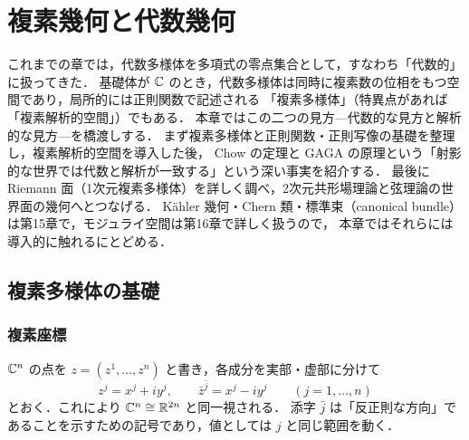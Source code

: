 \chapter{複素幾何と代数幾何}
\label{ch:ch13}

\begin{chapterlead}
これまでの章では，代数多様体を多項式の零点集合として，すなわち「代数的」に扱ってきた．
基礎体が $\mathbb{C}$ のとき，代数多様体は同時に複素数の位相をもつ空間であり，局所的には正則関数で記述される
「複素多様体」（特異点があれば「複素解析的空間」）でもある．
本章ではこの二つの見方---代数的な見方と解析的な見方---を橋渡しする．
まず複素多様体と正則関数・正則写像の基礎を整理し，複素解析的空間を導入した後，
Chow の定理と GAGA の原理という「射影的な世界では代数と解析が一致する」という深い事実を紹介する．
最後に Riemann 面（1次元複素多様体）を詳しく調べ，2次元共形場理論と弦理論の世界面の幾何へとつなげる．
Kähler 幾何・Chern 類・標準束（canonical bundle）は第15章で，モジュライ空間は第16章で詳しく扱うので，
本章ではそれらには導入的に触れるにとどめる．
\end{chapterlead}

\section{複素多様体の基礎}

\subsection{複素座標}

$\mathbb{C}^n$ の点を $z=(z^1,\dots,z^n)$ と書き，各成分を実部・虚部に分けて
\begin{equation}
  z^j = x^j + i y^j,\qquad \bar z^{\bar j} = x^j - i y^j \qquad (j=1,\dots,n)
\end{equation}
とおく．これにより $\mathbb{C}^n\cong\mathbb{R}^{2n}$ と同一視される．
添字 $\bar j$ は「反正則な方向」であることを示すための記号であり，値としては $j$ と同じ範囲を動く．

